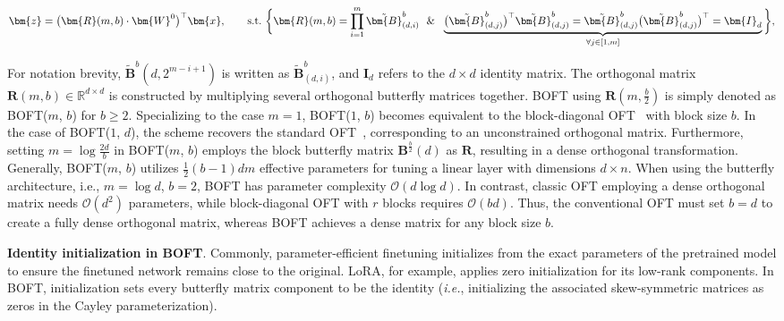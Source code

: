 \begin{equation}
    \begin{aligned}\nonumber
    \bm{z} = \big(\bm{R}(m, b) \cdot \bm{W}^0\big)^\top \bm{x}, \qquad \text{s.t.}~\bigg{\{} \bm{R}(m, b) = \prod_{i=1}^m \tilde{\bm{B}}^b_{(d, i)} ~~\&~~ \underbrace{\big(\tilde{\bm{B}}^b_{(d, j)}\big)^\top \tilde{\bm{B}}^b_{(d, j)} = \tilde{\bm{B}}^b_{(d, j)} \big(\tilde{\bm{B}}^b_{(d, j)}\big)^\top = \bm{I}_d}_{\forall j\in [1, m]} \bigg{\}},
    \end{aligned}
\end{equation}

For notation brevity, $\tilde{\bm{B}}^b(d, 2^{m-i+1})$ is written as $\tilde{\bm{B}}^b_{(d, i)}$, and $\bm{I}_d$ refers to the $d\times d$ identity matrix. The orthogonal matrix $\bm{R}(m, b)\in\mathbb{R}^{d\times d}$ is constructed by multiplying several orthogonal butterfly matrices together. BOFT using $\bm{R}(m, \frac{b}{2})$ is simply denoted as BOFT($m$, $b$) for $b\geq 2$. Specializing to the case $m=1$, BOFT($1$, $b$) becomes equivalent to the block-diagonal OFT~\cite{qiu2023controlling} with block size $b$. In the case of BOFT($1$, $d$), the scheme recovers the standard OFT~\cite{qiu2023controlling}, corresponding to an unconstrained orthogonal matrix. Furthermore, setting $m = \log \frac{2d}{b}$ in BOFT($m$, $b$) employs the block butterfly matrix $\bm{B}^{\frac{b}{2}}(d)$ as $\bm{R}$, resulting in a dense orthogonal transformation. Generally, BOFT($m$, $b$) utilizes $\frac{1}{2}(b-1)dm$ effective parameters for tuning a linear layer with dimensions $d\times n$. When using the butterfly architecture, i.e., $m = \log d$, $b = 2$, BOFT has parameter complexity $\mathcal{O}(d\log d)$. In contrast, classic OFT employing a dense orthogonal matrix needs $\mathcal{O}(d^2)$ parameters, while block-diagonal OFT with $r$ blocks requires $\mathcal{O}(bd)$. Thus, the conventional OFT must set $b = d$ to create a fully dense orthogonal matrix, whereas BOFT achieves a dense matrix for any block size $b$.

\textbf{Identity initialization in BOFT}. Commonly, parameter-efficient finetuning initializes from the exact parameters of the pretrained model to ensure the finetuned network remains close to the original. LoRA, for example, applies zero initialization for its low-rank components. In BOFT, initialization sets every butterfly matrix component to be the identity (\emph{i.e.}, initializing the associated skew-symmetric matrices as zeros in the Cayley parameterization).

